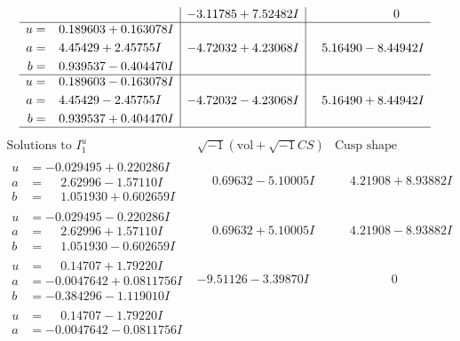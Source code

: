 \documentclass[1p]{elsarticle_modified}
\theoremstyle{definition}
\newcommand{\I}{\sqrt{-1}}
\begin{document}
$$\begin{array}{c|c|c}
 & -3.11785 + 7.52482 I & \phantom{-0.000000 } 0 \\ \hline\begin{aligned}
u &= \phantom{-}0.189603 + 0.163078 I \\
a &= \phantom{-}4.45429 + 2.45755 I \\
b &= \phantom{-}0.939537 - 0.404470 I\end{aligned}
 & -4.72032 + 4.23068 I & \phantom{-}5.16490 - 8.44942 I \\ \hline\begin{aligned}
u &= \phantom{-}0.189603 - 0.163078 I \\
a &= \phantom{-}4.45429 - 2.45755 I \\
b &= \phantom{-}0.939537 + 0.404470 I\end{aligned}
 & -4.72032 - 4.23068 I & \phantom{-}5.16490 + 8.44942 I\\
 \hline 
 \end{array}$$\newpage$$\begin{array}{c|c|c}  
\text{Solutions to }I^u_{1}& \I (\text{vol} + \sqrt{-1}CS) & \text{Cusp shape}\\
 \hline 
\begin{aligned}
u &= -0.029495 + 0.220286 I \\
a &= \phantom{-}2.62996 - 1.57110 I \\
b &= \phantom{-}1.051930 + 0.602659 I\end{aligned}
 & \phantom{-}0.69632 - 5.10005 I & \phantom{-}4.21908 + 8.93882 I \\ \hline\begin{aligned}
u &= -0.029495 - 0.220286 I \\
a &= \phantom{-}2.62996 + 1.57110 I \\
b &= \phantom{-}1.051930 - 0.602659 I\end{aligned}
 & \phantom{-}0.69632 + 5.10005 I & \phantom{-}4.21908 - 8.93882 I \\ \hline\begin{aligned}
u &= \phantom{-}0.14707 + 1.79220 I \\
a &= -0.0047642 + 0.0811756 I \\
b &= -0.384296 - 1.119010 I\end{aligned}
 & -9.51126 - 3.39870 I & \phantom{-0.000000 } 0 \\ \hline\begin{aligned}
u &= \phantom{-}0.14707 - 1.79220 I \\
a &= -0.0047642 - 0.0811756 I \\

\end{aligned}
\end{array}$$
\end{document}
